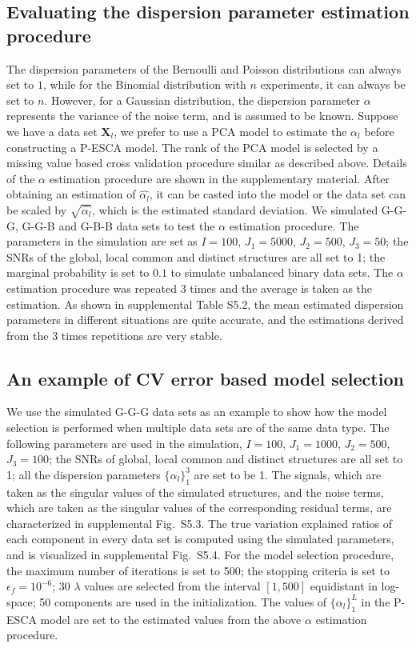 \subsection{Evaluating the dispersion parameter estimation procedure}
The dispersion parameters of the Bernoulli and Poisson distributions can always set to $1$, while for the Binomial distribution with $n$ experiments, it can always be set to $n$. However, for a Gaussian distribution, the dispersion parameter $\alpha$ represents the variance of the noise term, and is assumed to be known. Suppose we have a data set $\mathbf{X}_l$, we prefer to use a PCA model to estimate the $\alpha_l$ before constructing a P-ESCA model. The rank of the PCA model is selected by a missing value based cross validation procedure similar as described above. Details of the $\alpha$ estimation procedure are shown in the supplementary material. After obtaining an estimation of $\hat{\alpha_l}$, it can be casted into the model or the data set can be scaled by $\sqrt{\hat{\alpha_l}}$, which is the estimated standard deviation. We simulated G-G-G, G-G-B and G-B-B data sets to test the $\alpha$ estimation procedure. The parameters in the simulation are set as $I = 100$, $J_1 = 5000$, $J_2 = 500$, $J_3 = 50$; the SNRs of the global, local common and distinct structures are all set to 1; the marginal probability is set to $0.1$ to simulate unbalanced binary data sets. The $\alpha$ estimation procedure was repeated 3 times and the average is taken as the estimation. As shown in supplemental Table S5.2, the mean estimated dispersion parameters in different situations are quite accurate, and the estimations derived from the 3 times repetitions are very stable.

\subsection{An example of CV error based model selection}
We use the simulated G-G-G data sets as an example to show how the model selection is performed when multiple data sets are of the same data type. The following parameters are used in the simulation, $I = 100$, $J_1 = 1000$, $J_2 = 500$, $J_3 = 100$; the SNRs of global, local common and distinct structures are all set to 1; all the dispersion parameters $\{\alpha_l\}_1^3$ are set to be 1. The signals, which are taken as the singular values of the simulated structures, and the noise terms, which are taken as the singular values of the corresponding residual terms, are characterized in supplemental Fig.~S5.3. The true variation explained ratios of each component in every data set is computed using the simulated parameters, and is visualized in supplemental Fig.~S5.4. For the model selection procedure, the maximum number of iterations is set to 500; the stopping criteria is set to $\epsilon_{f} = 10^{-6}$; 30 $\lambda$ values are selected from the interval $[1,500]$ equidistant in log-space; 50 components are used in the initialization. The values of $\{ \alpha_{l} \}_{1}^{L}$ in the P-ESCA model are set to the estimated values from the above $\alpha$ estimation procedure.

